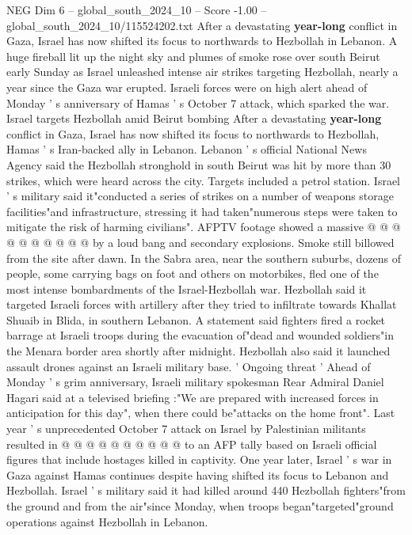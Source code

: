 \begin{textsample}{NEG Dim 6 – global\_south\_2024\_10 – Score -1.00 – global\_south\_2024\_10/115524202.txt}  \label{ex:f6_neg_030}
After a devastating \textbf{year-long} conflict in Gaza, Israel has now shifted its focus to northwards to Hezbollah in Lebanon.
A huge fireball lit up the night sky and plumes of smoke rose over south Beirut early Sunday as Israel unleashed intense air strikes targeting Hezbollah, nearly a year since the Gaza war erupted.
Israeli forces were on high alert ahead of Monday ' s anniversary of Hamas ' s October 7 attack, which sparked the war.
Israel targets Hezbollah amid Beirut bombing After a devastating \textbf{year-long} conflict in Gaza, Israel has now shifted its focus to northwards to Hezbollah, Hamas ' s Iran-backed ally in Lebanon.
Lebanon ' s official National News Agency said the Hezbollah stronghold in south Beirut was hit by more than 30 strikes, which were heard across the city.
Targets included a petrol station.
Israel ' s military said it"conducted a series of strikes on a number of weapons storage facilities"and infrastructure, stressing it had taken"numerous steps were taken to mitigate the risk of harming civilians".
AFPTV footage showed a massive @ @ @ @ @ @ @ @ @ @ by a loud bang and secondary explosions.
Smoke still billowed from the site after dawn.
In the Sabra area, near the southern suburbs, dozens of people, some carrying bags on foot and others on motorbikes, fled one of the most intense bombardments of the Israel-Hezbollah war.
Hezbollah said it targeted Israeli forces with artillery after they tried to infiltrate towards Khallat Shuaib in Blida, in southern Lebanon.
A statement said fighters fired a rocket barrage at Israeli troops during the evacuation of"dead and wounded soldiers"in the Menara border area shortly after midnight.
Hezbollah also said it launched assault drones against an Israeli military base. ' Ongoing threat ' Ahead of Monday ' s grim anniversary, Israeli military spokesman Rear Admiral Daniel Hagari said at a televised briefing :"We are prepared with increased forces in anticipation for this day", when there could be"attacks on the home front".
Last year ' s unprecedented October 7 attack on Israel by Palestinian militants resulted in @ @ @ @ @ @ @ @ @ @ to an AFP tally based on Israeli official figures that include hostages killed in captivity.
One year later, Israel ' s war in Gaza against Hamas continues despite having shifted its focus to Lebanon and Hezbollah.
Israel ' s military said it had killed around 440 Hezbollah fighters"from the ground and from the air"since Monday, when troops began"targeted"ground operations against Hezbollah in Lebanon.

\end{textsample}
